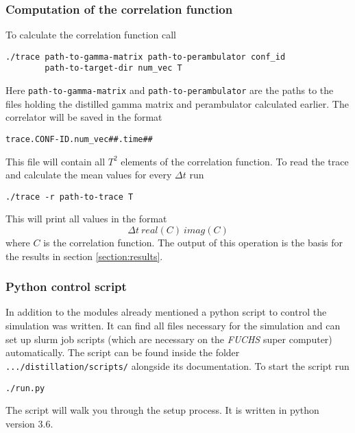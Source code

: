     \subsubsection{Computation of the correlation function}
        To calculate the correlation function call
        \begin{verbatim}
./trace path-to-gamma-matrix path-to-perambulator conf_id 
        path-to-target-dir num_vec T\end{verbatim}
        Here \verb+path-to-gamma-matrix+ and \verb+path-to-perambulator+ are the paths to the files holding the distilled gamma matrix and perambulator calculated earlier. The correlator will be saved in the format
        \begin{verbatim}
trace.CONF-ID.num_vec##.time##\end{verbatim}
        This file will contain all $T^2$ elements of the correlation function. To read the trace and calculate the mean values for every $\Delta t$ run
        \begin{verbatim}
./trace -r path-to-trace T\end{verbatim}
        This will print all values in the format 
        $$\Delta t\ real(C)\ imag(C)$$
        where $C$ is the correlation function. The output of this operation is the basis for the results in section \ref{section:results}.
        
    \subsubsection{Python control script}
        In addition to the modules already mentioned a python script to control the simulation was written. It can find all files necessary for the simulation and can set up slurm job scripts (which are necessary on the \textit{FUCHS} super computer) automatically. The script can be found inside the folder \verb+.../distillation/scripts/+ alongside its documentation. To start the script run
        \begin{verbatim}
./run.py\end{verbatim}
        The script will walk you through the setup process. It is written in python version 3.6.
    